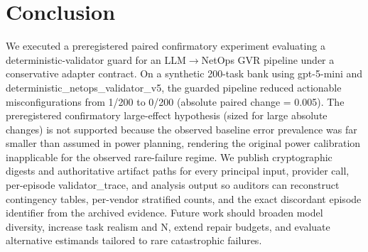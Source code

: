 \documentclass[conference]{IEEEtran}
\begin{document}
\section{Conclusion}
We executed a preregistered paired confirmatory experiment evaluating a deterministic-validator guard for an LLM\ensuremath{\rightarrow}NetOps GVR pipeline under a conservative adapter contract. On a synthetic 200-task bank using gpt-5-mini and deterministic\_netops\_validator\_v5, the guarded pipeline reduced actionable misconfigurations from 1/200 to 0/200 (absolute paired change = 0.005). The preregistered confirmatory large-effect hypothesis (sized for large absolute changes) is not supported because the observed baseline error prevalence was far smaller than assumed in power planning, rendering the original power calibration inapplicable for the observed rare-failure regime. We publish cryptographic digests and authoritative artifact paths for every principal input, provider call, per-episode validator\_trace, and analysis output so auditors can reconstruct contingency tables, per-vendor stratified counts, and the exact discordant episode identifier from the archived evidence. Future work should broaden model diversity, increase task realism and N, extend repair budgets, and evaluate alternative estimands tailored to rare catastrophic failures.
\end{document}
